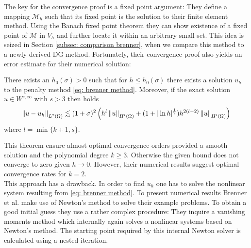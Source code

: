 The key for the convergence proof is a fixed point argument: %
They define a mapping $\mathcal M_h$ such that its fixed point is the solution to their finite element method. 
Using the Banach fixed point theorem they can show existence of a fixed point of $\mathcal M$ in $V_h$ and further locate it within an arbitrary small set. This idea is seized in Section \ref{subsec: comparison brenner}, when we compare this method to a newly derived DG method. Fortunately, their convergence proof also yields an error estimate for their numerical solution:
\begin{theorem}\label{thm: error estimate brenner}
	There exists an $h_0(\sigma) > 0$ such that for $h \leq h_0(\sigma)$ there exists a solution $u_h$ to the penalty method \eqref{eq: brenner method}. Moreover, if the exact solution $u \in W^{s,\infty}$ with $s>3$ then holds
	\begin{align*}
		\left\lVert u-u_h \right\rVert_{L^2(\Omega)} \lesssim (1+\sigma)^2 
		                        \left(h^{l} \left\lVert u \right\rVert_{H^l(\Omega)} + (1+ | \ln h |^{\frac 1 2 }) h^{2(l-2)} \left\lVert u \right\rVert_{H^l(\Omega)} \right)
	\end{align*}
where $l=\min\{k+1,s\}$. 
\end{theorem}
This theorem ensure almost optimal convergence orders provided a smooth solution and the polynomial degree $k\geq 3$. Otherwise the given bound does not converge to zero given $h \rightarrow 0$. However, their numerical results suggest optimal convergence rates for $k=2$.\\
This approach has a drawback. In order to find $u_h$ one has to solve the nonlinear system resulting from \eqref{eq: brenner method}. To present numerical results Brenner et al. make use of Newton's method to solve their example problems. 
To obtain a good initial guess they use a rather complex procedure: They inquire a vanishing moments method which internally again solves a nonlinear systems based on Newton's method. The starting point required by this internal Newton solver is calculated using a nested iteration.


